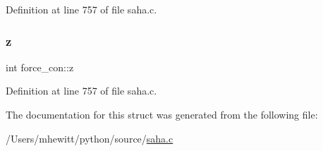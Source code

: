 Definition at line 757 of file saha.\+c.

\mbox{\label{structforce__con_a09f9e42431e42838f1664ad6b2a186a9}} 
\subsubsection{\texorpdfstring{z}{z}}
{\footnotesize\ttfamily int force\+\_\+con\+::z}



Definition at line 757 of file saha.\+c.



The documentation for this struct was generated from the following file\+:\begin{DoxyCompactItemize}
\item 
/\+Users/mhewitt/python/source/\hyperlink{saha_8c}{saha.\+c}\end{DoxyCompactItemize}

